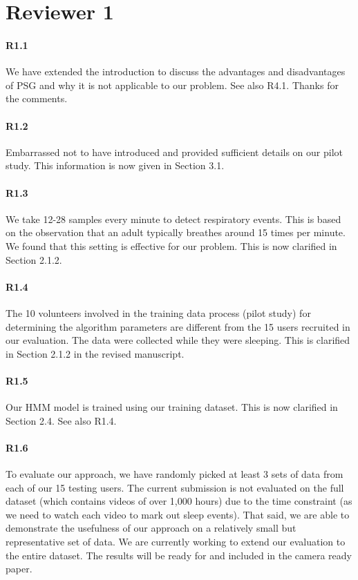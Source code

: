 \section*{Reviewer 1}
\vspace{-2mm}
\paragraph{R1.1} We have extended the introduction to discuss the advantages and disadvantages of PSG and why it is not applicable to our
problem. See also R4.1. Thanks for the comments.

\paragraph{R1.2} Embarrassed not to have introduced and provided sufficient details on our pilot study. This information is now given in Section 3.1.
\vspace{-2mm}
\paragraph{R1.3} We take 12-28 samples every minute to detect respiratory events. This is based on the observation that an adult typically
breathes around 15 times per minute. We found that this setting is effective for our problem. This is now clarified in Section 2.1.2.

\paragraph{R1.4} The 10 volunteers involved in the training data process (pilot study) for determining the algorithm parameters are different from the 15 users recruited in our
evaluation. The data were collected while they were sleeping. This is clarified in Section 2.1.2 in the revised manuscript.

\paragraph{R1.5} Our HMM model is trained using our training dataset. This is now clarified in Section 2.4. See also R1.4.
\vspace{-2mm}
\paragraph{R1.6} To evaluate our approach, we have randomly picked at least 3 sets of data from each of our 15 testing users.
The current submission is not evaluated on the full dataset (which contains videos of over 1,000 hours) due to the time constraint (as we
need to watch each video to mark out sleep events). That said, we are able to demonstrate the usefulness of our approach on a relatively
small but representative set of data. We are currently working to extend our evaluation to the entire dataset. The results will be ready
for and included in the camera ready paper.

